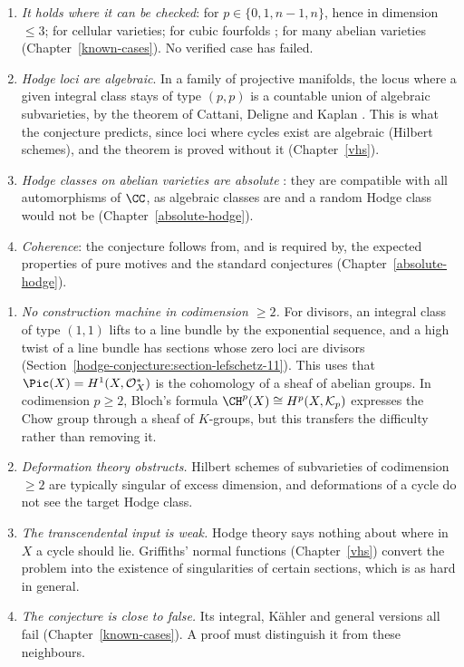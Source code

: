 \begin{remark}[Evidence]\label{hodge-conjecture:remark-evidence}
\begin{enumerate}
\item \emph{It holds where it can be checked}: for $p \in \{0, 1, n-1, n\}$, hence in dimension $\leq 3$; for cellular varieties; for cubic fourfolds \cite{zucker-1977}; for many abelian
varieties (Chapter~\ref{known-cases}). No verified case has failed.
\item \emph{Hodge loci are algebraic}. In a family of projective manifolds, the locus where a given integral class stays of type $(p,p)$ is a countable union of algebraic subvarieties, by the
theorem of Cattani, Deligne and Kaplan \cite{cattani-deligne-kaplan}. This is what the conjecture predicts, since loci where cycles exist are algebraic (Hilbert schemes), and the theorem is
proved without it (Chapter~\ref{vhs}).
\item \emph{Hodge classes on abelian varieties are absolute} \cite{deligne-abelian}: they are compatible with all automorphisms of $\CC$, as algebraic classes are and a random Hodge class would not be
(Chapter~\ref{absolute-hodge}).
\item \emph{Coherence}: the conjecture follows from, and is required by, the expected properties of pure motives and the standard conjectures (Chapter~\ref{absolute-hodge}).
\end{enumerate}
\end{remark}

\begin{remark}[Difficulty]\label{hodge-conjecture:remark-difficulty}
\begin{enumerate}
\item \emph{No construction machine in codimension $\geq 2$.} For divisors, an integral class of type $(1,1)$ lifts to a line bundle by the exponential sequence, and a high twist of a line bundle
has sections whose zero loci are divisors (Section~\ref{hodge-conjecture:section-lefschetz-11}). This uses that $\Pic(X) = H^1(X, \mathcal{O}_X^*)$ is the cohomology of a sheaf of abelian groups. In codimension $p \geq 2$,
Bloch's formula $\CH^p(X) \cong H^p(X, \mathcal{K}_p)$ expresses the Chow group through a sheaf of $K$-groups, but this transfers the difficulty rather than removing it.
\item \emph{Deformation theory obstructs.} Hilbert schemes of subvarieties of codimension $\geq 2$ are typically singular of excess dimension, and deformations of a cycle do not see the target
Hodge class.
\item \emph{The transcendental input is weak.} Hodge theory says nothing about where in $X$ a cycle should lie. Griffiths' normal functions (Chapter~\ref{vhs}) convert the problem
into the existence of singularities of certain sections, which is as hard in general.
\item \emph{The conjecture is close to false.} Its integral, K\"ahler and general versions all fail (Chapter~\ref{known-cases}). A proof must distinguish it from these neighbours.
\end{enumerate}
\end{remark}

